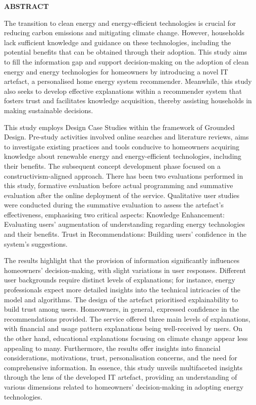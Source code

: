  \setcounter{page}{3}
\begin{center}
{\Large{\bf{ABSTRACT}}}
\end{center}

\noindent
The transition to clean energy and energy-efficient technologies is crucial for reducing carbon emissions and mitigating climate change. 
However, households lack sufficient knowledge and guidance on these technologies, including the potential benefits that can be obtained through their adoption.
This study aims to fill the information gap and support decision-making on the adoption of clean energy and energy technologies for homeowners by introducing a novel IT artefact, a personalised home energy system recommender.
Meanwhile, this study also seeks to develop effective explanations within a recommender system that fosters trust and facilitates knowledge acquisition, thereby assisting households in making sustainable decisions.

This study employs Design Case Studies within the framework of Grounded Design. 
Pre-study activities involved online searches and literature reviews,
aims to investigate existing practices and tools conducive to homeowners acquiring knowledge about renewable energy and energy-efficient technologies, including their benefits.
The subsequent concept development phase focused on a constructivism-aligned approach. 
There has been two evaluations performed in this study, formative evaluation before actual programming and summative evaluation after the online deployment of the service.
Qualitative user studies were conducted during the summative evaluation to assess the artefact's effectiveness, emphasising two critical aspects: 
Knowledge Enhancement: Evaluating users' augmentation of understanding regarding energy technologies and their benefits.
Trust in Recommendations: Building users' confidence in the system's suggestions.

The results highlight that the provision of information significantly influences homeowners' decision-making, with slight variations in user responses. 
Different user backgrounds require distinct levels of explanations; for instance, energy professionals expect more detailed insights into the technical intricacies of the model and algorithms.
The design of the artefact prioritised explainability to build trust among users. 
Homeowners, in general, expressed confidence in the recommendations provided. 
The service offered three main levels of explanations, with financial and usage pattern explanations being well-received by users. 
On the other hand, educational explanations focusing on climate change appear less appealing to many.
Furthermore, the results offer insights into financial considerations, motivations, trust, personalisation concerns, and the need for comprehensive information. 
In essence, this study unveils multifaceted insights through the lens of the developed IT artefact, providing an understanding of various dimensions related to homeowners' decision-making in adopting energy technologies.



